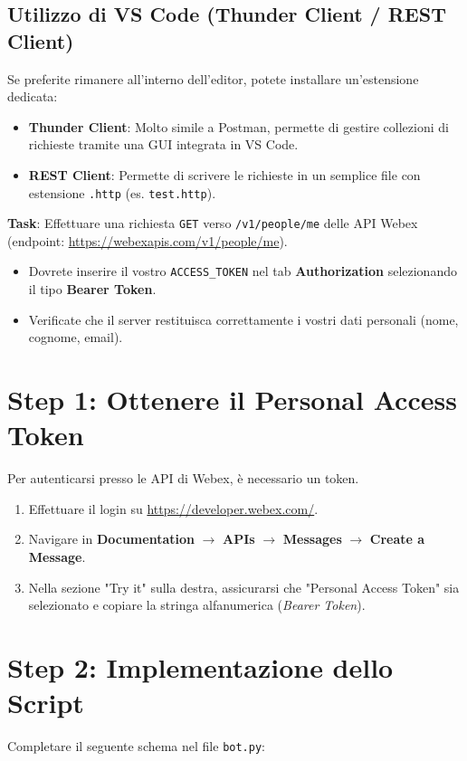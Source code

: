 \documentclass[11pt,a4paper]{article}
\begin{document}
\subsection{Utilizzo di VS Code (Thunder Client / REST Client)}
Se preferite rimanere all'interno dell'editor, potete installare un'estensione dedicata:
\begin{itemize}
    \item \textbf{Thunder Client}: Molto simile a Postman, permette di gestire collezioni di richieste tramite una GUI integrata in VS Code.
    \item \textbf{REST Client}: Permette di scrivere le richieste in un semplice file con estensione \texttt{.http} (es. \texttt{test.http}).
\end{itemize}

\textbf{Task}: Effettuare una richiesta \texttt{GET} verso \texttt{/v1/people/me} delle API Webex (endpoint: \url{https://webexapis.com/v1/people/me}). 
\begin{itemize}
    \item Dovrete inserire il vostro \texttt{ACCESS\_TOKEN} nel tab \textbf{Authorization} selezionando il tipo \textbf{Bearer Token}.
    \item Verificate che il server restituisca correttamente i vostri dati personali (nome, cognome, email).
\end{itemize}

\section{Step 1: Ottenere il Personal Access Token}
Per autenticarsi presso le API di Webex, è necessario un token. 
\begin{enumerate}
    \item Effettuare il login su \url{https://developer.webex.com/}.
    \item Navigare in \textbf{Documentation} $\rightarrow$ \textbf{APIs} $\rightarrow$ \textbf{Messages} $\rightarrow$ \textbf{Create a Message}.
    \item Nella sezione "Try it" sulla destra, assicurarsi che "Personal Access Token" sia selezionato e copiare la stringa alfanumerica (\textit{Bearer Token}).
\end{enumerate}

\section{Step 2: Implementazione dello Script}
Completare il seguente schema nel file \texttt{bot.py}:
\end{document}
